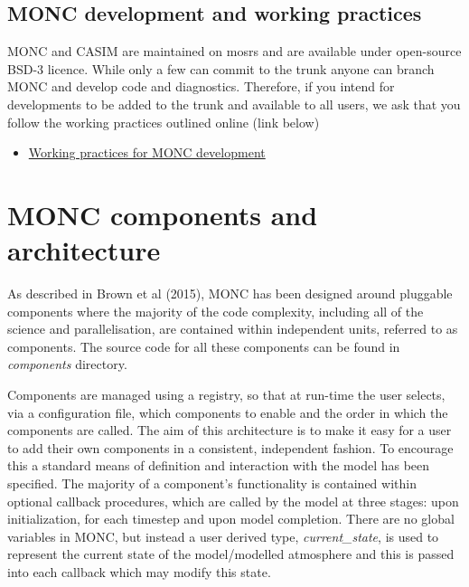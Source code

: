 \documentclass[a4paper,11pt]{article}
\begin{document}
\subsection{MONC development and working practices}

MONC and CASIM are maintained on mosrs and are available under open-source
BSD-3 licence. While only a few can commit to the trunk anyone can branch
MONC and develop code and diagnostics. Therefore, if you intend for developments
to be added to the trunk and available to all users, we ask that you follow the working
practices outlined online (link below)
\begin{itemize}
  \item {\href{https://code.metoffice.gov.uk/trac/monc/wiki/MoncDoc/MoncUserguide/MoncWorkingPractices}
  {Working practices for MONC development}}
\end{itemize}

\section{MONC components and architecture}

As described in Brown et al (2015), MONC has been designed around pluggable components
where the majority of the code complexity, including all of the science and
parallelisation, are contained within independent units, referred to as components.
The source code for all these components can be found in \emph{components} directory.

Components are managed using a registry, so that at run-time the user selects,
via a configuration file, which components to enable and the order in which
the components are called. The aim of this architecture is to make it easy for
a user to add their own components in a consistent, independent fashion.
To encourage this a standard means of definition and
interaction with the model has been specified. The majority of a component's
functionality is contained within optional callback procedures, which are called
by the model at three stages: upon initialization, for each timestep and upon
model completion.  There are no global variables in MONC, but instead a user
derived type, {\emph{current\_state}}, is used to represent the current state of
the model/modelled atmosphere and this is passed into each callback which may
modify this state.
\end{document}
